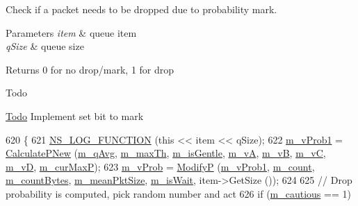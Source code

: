 Check if a packet needs to be dropped due to probability mark. 


\begin{DoxyParams}{Parameters}
{\em item} & queue item \\
\hline
{\em q\+Size} & queue size \\
\hline
\end{DoxyParams}
\begin{DoxyReturn}{Returns}
0 for no drop/mark, 1 for drop 
\end{DoxyReturn}
\begin{DoxyRefDesc}{Todo}
\item[\hyperlink{todo__todo000162}{Todo}]Implement set bit to mark \end{DoxyRefDesc}

\begin{DoxyCode}
620 \{
621   \hyperlink{log-macros-disabled_8h_a90b90d5bad1f39cb1b64923ea94c0761}{NS\_LOG\_FUNCTION} (\textcolor{keyword}{this} << item << qSize);
622   \hyperlink{classns3_1_1RedQueueDisc_a1f46b551657e62ae3064e392fdd6535b}{m\_vProb1} = \hyperlink{classns3_1_1RedQueueDisc_a46c9c2c961936c0423e28afd07a2c4cf}{CalculatePNew} (\hyperlink{classns3_1_1RedQueueDisc_ad51f583bf9d9964833fd8a710a40e247}{m\_qAvg}, \hyperlink{classns3_1_1RedQueueDisc_a631761d4c950b0408ba26f42a0509c42}{m\_maxTh}, 
      \hyperlink{classns3_1_1RedQueueDisc_ad9c91813fb21151ac137681a2b1fb0c8}{m\_isGentle}, \hyperlink{classns3_1_1RedQueueDisc_a03f1bf584c3f8f07a33719f54b73dd76}{m\_vA}, \hyperlink{classns3_1_1RedQueueDisc_a983ababdb1d4eecd65c2f08af7ab5cd3}{m\_vB}, \hyperlink{classns3_1_1RedQueueDisc_ae06b2dbe2b79013c1b7682bbda4fd182}{m\_vC}, \hyperlink{classns3_1_1RedQueueDisc_ace5d2581758baa698fc2e5ebe4842026}{m\_vD}, \hyperlink{classns3_1_1RedQueueDisc_af00e660caa4f7360e23b9f667382b1c6}{m\_curMaxP});
623   \hyperlink{classns3_1_1RedQueueDisc_aa24ff74b774ceb929bc49fe289fbf31c}{m\_vProb} = \hyperlink{classns3_1_1RedQueueDisc_a70b8f8954389cbc428531803e24ed5ee}{ModifyP} (\hyperlink{classns3_1_1RedQueueDisc_a1f46b551657e62ae3064e392fdd6535b}{m\_vProb1}, \hyperlink{classns3_1_1RedQueueDisc_ac096c7624d6d921f4612e6e1852193f7}{m\_count}, 
      \hyperlink{classns3_1_1RedQueueDisc_a7bcb375212b9757440dd9cf3e8f1ab5b}{m\_countBytes}, \hyperlink{classns3_1_1RedQueueDisc_a70edac67edac4ce7c4a7d4325cf1e409}{m\_meanPktSize}, \hyperlink{classns3_1_1RedQueueDisc_a581b90ab14e1387a63b11dd7d03a3e00}{m\_isWait}, item->GetSize ());
624 
625   \textcolor{comment}{// Drop probability is computed, pick random number and act}
626   \textcolor{keywordflow}{if} (\hyperlink{classns3_1_1RedQueueDisc_a2156a26538fe0259220ca9e57c829c34}{m\_cautious} == 1)

\end{DoxyCode}
